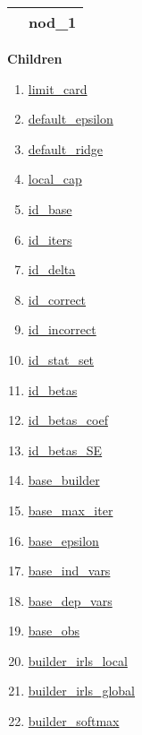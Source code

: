 {\renewcommand{\arraystretch}{1.5}
\begin{tabularx}{\textwidth}{|>{\raggedright\arraybackslash}l|X|}
\hline
\hspace{0pt}\mytexttt{\color{red} } & \textbf{nod\_1} \\
\hline
\end{tabularx}
}

\par


\textbf{Children}
\begin{enumerate}
\item \hyperlink{ecldoc:constants.limit_card}{limit\_card}
\item \hyperlink{ecldoc:constants.default_epsilon}{default\_epsilon}
\item \hyperlink{ecldoc:constants.default_ridge}{default\_ridge}
\item \hyperlink{ecldoc:constants.local_cap}{local\_cap}
\item \hyperlink{ecldoc:constants.id_base}{id\_base}
\item \hyperlink{ecldoc:constants.id_iters}{id\_iters}
\item \hyperlink{ecldoc:constants.id_delta}{id\_delta}
\item \hyperlink{ecldoc:constants.id_correct}{id\_correct}
\item \hyperlink{ecldoc:constants.id_incorrect}{id\_incorrect}
\item \hyperlink{ecldoc:constants.id_stat_set}{id\_stat\_set}
\item \hyperlink{ecldoc:constants.id_betas}{id\_betas}
\item \hyperlink{ecldoc:constants.id_betas_coef}{id\_betas\_coef}
\item \hyperlink{ecldoc:constants.id_betas_se}{id\_betas\_SE}
\item \hyperlink{ecldoc:constants.base_builder}{base\_builder}
\item \hyperlink{ecldoc:constants.base_max_iter}{base\_max\_iter}
\item \hyperlink{ecldoc:constants.base_epsilon}{base\_epsilon}
\item \hyperlink{ecldoc:constants.base_ind_vars}{base\_ind\_vars}
\item \hyperlink{ecldoc:constants.base_dep_vars}{base\_dep\_vars}
\item \hyperlink{ecldoc:constants.base_obs}{base\_obs}
\item \hyperlink{ecldoc:constants.builder_irls_local}{builder\_irls\_local}
\item \hyperlink{ecldoc:constants.builder_irls_global}{builder\_irls\_global}
\item \hyperlink{ecldoc:constants.builder_softmax}{builder\_softmax}
\end{enumerate}

